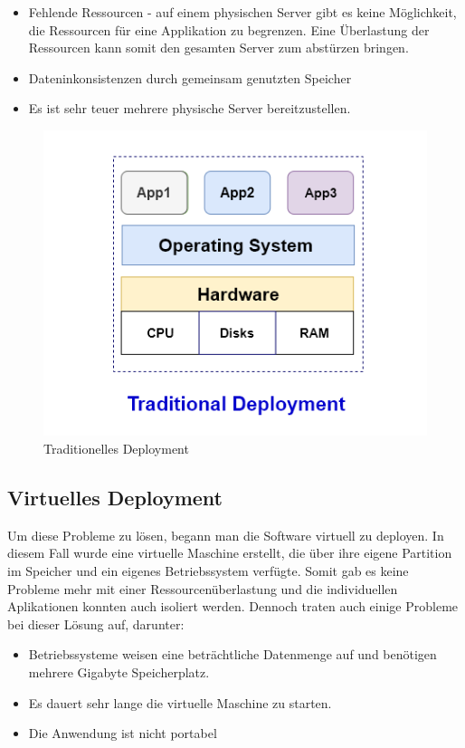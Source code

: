 \begin{itemize}
    \item Fehlende Ressourcen - auf einem physischen Server gibt es keine Möglichkeit, die Ressourcen für eine Applikation zu begrenzen. Eine Überlastung der Ressourcen kann somit den gesamten Server zum abstürzen bringen.
    \item Dateninkonsistenzen durch gemeinsam genutzten Speicher
    \item Es ist sehr teuer mehrere physische Server bereitzustellen.
\end{itemize}

\begin{figure}[h]
    \centering
    \includegraphics[width=0.8\linewidth]{pics/traditionelles-deployment.png}
    \caption{Traditionelles Deployment}
    \label{fig:enter-label}
\end{figure}


\cite{Traditional_vs_Container_vs_Virtuell_Deployment}


\subsection{Virtuelles Deployment}
Um diese Probleme zu lösen, begann man die Software virtuell zu deployen. In diesem Fall wurde eine virtuelle Maschine erstellt, die über ihre eigene Partition im Speicher und ein eigenes Betriebssystem verfügte. Somit gab es keine Probleme mehr mit einer Ressourcenüberlastung und die individuellen Aplikationen konnten auch isoliert werden. Dennoch traten auch einige Probleme bei dieser Lösung auf, darunter:

\begin{itemize}
\item Betriebssysteme weisen eine beträchtliche Datenmenge auf und benötigen mehrere Gigabyte Speicherplatz.
\item Es dauert sehr lange die virtuelle Maschine zu starten.
\item  Die Anwendung ist nicht portabel
\end{itemize}

